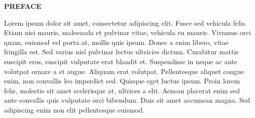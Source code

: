 \begin{center}
\vspace*{52pt}
{\Large \textbf{PREFACE}}
\end{center}

Lorem ipsum dolor sit amet, consectetur adipiscing elit. Fusce sed vehicula felis. Etiam nisi mauris, malesuada et pulvinar vitae, vehicula eu mauris. Vivamus orci quam, euismod vel porta at, mollis quis ipsum. Donec a enim libero, vitae fringilla est. Sed varius nisl pulvinar lectus ultricies dictum. Curabitur mattis suscipit eros, suscipit vulputate erat blandit et. Suspendisse in neque ac ante volutpat ornare a et augue. Aliquam erat volutpat. Pellentesque aliquet congue enim, non convallis leo imperdiet sed. Quisque eget luctus ipsum. Proin lorem felis, molestie sit amet scelerisque at, ultrices a elit. Aenean placerat enim sed ante convallis quis vulputate orci bibendum. Duis sit amet accumsan magna. Sed adipiscing enim non elit pellentesque euismod.
